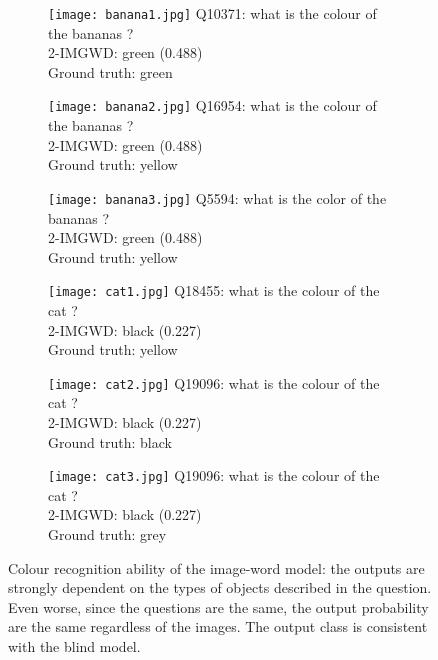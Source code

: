 \begin{figure}\footnotesize
\begin{subfigure}[t]{0.3\textwidth}
    \texttt{[image: banana1.jpg]}
    Q10371: what is the colour of the bananas ?\\
    2-IMGWD: green (0.488)\\
    Ground truth: green\\
\end{subfigure}
\quad
\begin{subfigure}[t]{0.3\textwidth}
    \texttt{[image: banana2.jpg]}
    Q16954: what is the colour of the bananas ?\\
    2-IMGWD: green (0.488)\\
    Ground truth: yellow\\
\end{subfigure}
\quad
\begin{subfigure}[t]{0.3\textwidth}
    \texttt{[image: banana3.jpg]}
    Q5594: what is the color of the bananas ?\\
    2-IMGWD: green (0.488)\\
    Ground truth: yellow\\
\end{subfigure}

\begin{subfigure}[t]{0.3\textwidth}
    \texttt{[image: cat1.jpg]}
    Q18455: what is the colour of the cat ?\\
    2-IMGWD: black (0.227)\\
    Ground truth: yellow
\end{subfigure}
\quad
\begin{subfigure}[t]{0.3\textwidth}
    \texttt{[image: cat2.jpg]}
    Q19096: what is the colour of the cat ?\\
    2-IMGWD: black (0.227)\\
    Ground truth: black
\end{subfigure}
\quad
\begin{subfigure}[t]{0.3\textwidth}
    \texttt{[image: cat3.jpg]}
    Q19096: what is the colour of the cat ?\\
    2-IMGWD: black (0.227)\\
    Ground truth: grey
\end{subfigure}

\caption{Colour recognition ability of the image-word model: the outputs are strongly dependent on the types of objects described in the question. Even worse, since the questions are the same, the output probability are the same regardless of the images. The output class is consistent with the blind model.}
\label{fig:cocoqa_colour}
\end{figure}

